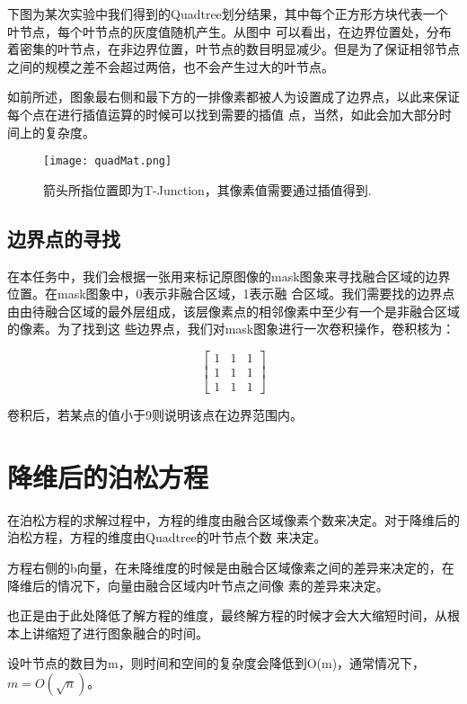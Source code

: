 \documentclass[10pt,twocolumn,letterpaper]{ctexart}
\begin{document}
   下图为某次实验中我们得到的Quadtree划分结果，其中每个正方形方块代表一个叶节点，每个叶节点的灰度值随机产生。从图中
   可以看出，在边界位置处，分布着密集的叶节点，在非边界位置，叶节点的数目明显减少。但是为了保证相邻节点之间的规模之差不会超过两倍，也不会产生过大的叶节点。

   如前所述，图象最右侧和最下方的一排像素都被人为设置成了边界点，以此来保证每个点在进行插值运算的时候可以找到需要的插值
   点，当然，如此会加大部分时间上的复杂度。
   \begin{figure}[t]
   \begin{center}
      \texttt{[image: quadMat.png]}
   \end{center}
      \caption{箭头所指位置即为T-Junction，其像素值需要通过插值得到.}
   \label{fig:long}
   \label{fig:onecol}
   \end{figure}
\subsection{边界点的寻找}
   在本任务中，我们会根据一张用来标记原图像的mask图象来寻找融合区域的边界位置。在mask图象中，0表示非融合区域，1表示融
   合区域。我们需要找的边界点由由待融合区域的最外层组成，该层像素点的相邻像素中至少有一个是非融合区域的像素。为了找到这
   些边界点，我们对mask图象进行一次卷积操作，卷积核为：

   \begin{equation}
   \begin{bmatrix}
   1 & 1 & 1\\
   1 & 1 & 1\\
   1 & 1 & 1
   \end{bmatrix}
   \end{equation}

   卷积后，若某点的值小于9则说明该点在边界范围内。
\section{降维后的泊松方程}
   在泊松方程的求解过程中，方程的维度由融合区域像素个数来决定。对于降维后的泊松方程，方程的维度由Quadtree的叶节点个数
   来决定。

   方程右侧的b向量，在未降维度的时候是由融合区域像素之间的差异来决定的，在降维后的情况下，向量由融合区域内叶节点之间像
   素的差异来决定。

   也正是由于此处降低了解方程的维度，最终解方程的时候才会大大缩短时间，从根本上讲缩短了进行图象融合的时间。

   设叶节点的数目为m，则时间和空间的复杂度会降低到O(m)，通常情况下，$m = O(\sqrt{n})$。
\end{document}
